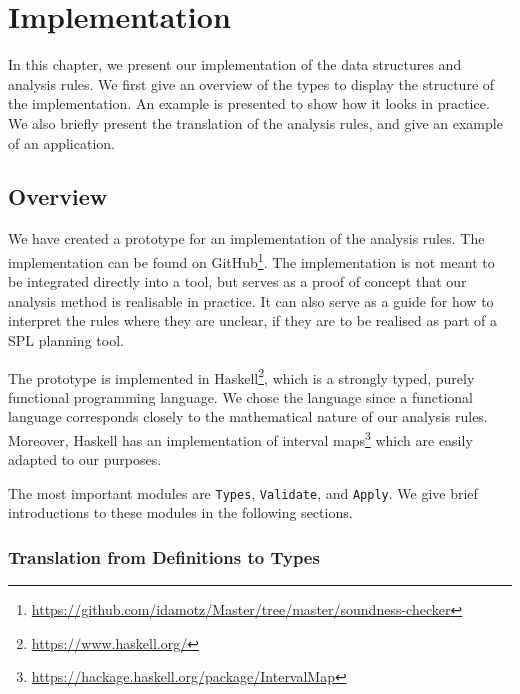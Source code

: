 \chapter{Implementation}  
\label{cha:implementation}

In this chapter, we present our implementation of the data structures and analysis rules. We first give an overview of the types to display the structure of the implementation. An example is presented to show how it looks in practice. We also briefly present the translation of the analysis rules, and give an example of an application.


\section{Overview}
\label{sec:overview}
We have created a prototype for an implementation of the analysis rules. The implementation can be found on GitHub\footnote{\url{https://github.com/idamotz/Master/tree/master/soundness-checker}}. The implementation is not meant to be integrated directly into a tool, but serves as a proof of concept that our analysis method is realisable in practice. It can also serve as a guide for how to interpret the rules where they are unclear, if they are to be realised as part of a SPL planning tool. 

The prototype is implemented in Haskell\footnote{\url{https://www.haskell.org/}}, which is a strongly typed, purely functional programming language. We chose the language since a functional language corresponds closely to the mathematical nature of our analysis rules. Moreover, Haskell has an implementation of interval maps\footnote{\url{https://hackage.haskell.org/package/IntervalMap}} which are easily adapted to our purposes. 

The most important modules are \texttt{Types},
\texttt{Validate}, and \texttt{Apply}. We give brief introductions to these modules in the following sections. 

\subsection{Translation from Definitions to Types}
\label{sub:the-types-module}

